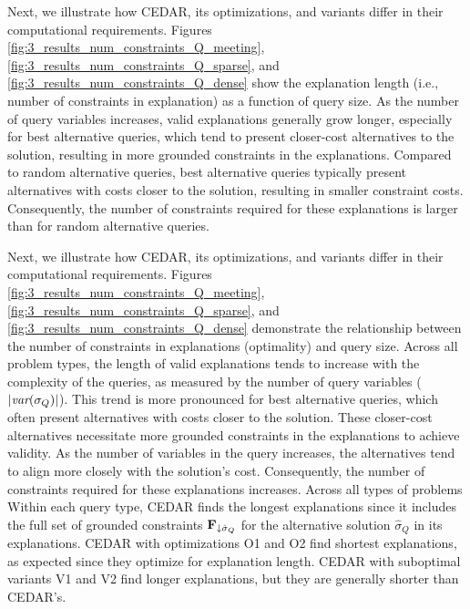 \documentclass[twoside,11pt]{article}
\begin{document}
Next, we illustrate how CEDAR, its optimizations, and variants differ in their computational requirements. Figures \ref{fig:3_results_num_constraints_Q_meeting}, \ref{fig:3_results_num_constraints_Q_sparse}, and \ref{fig:3_results_num_constraints_Q_dense} show the explanation length (i.e., number of constraints in explanation) as a function of query size. As the number of query variables increases, valid explanations generally grow longer, especially for best alternative queries, which tend to present closer-cost alternatives to the solution, resulting in more grounded constraints in the explanations. Compared to random alternative queries, best alternative queries typically present alternatives with costs closer to the solution, resulting in smaller constraint costs. Consequently, the number of constraints required for these explanations is larger than for random alternative queries.


Next, we illustrate how CEDAR, its optimizations, and variants differ in their computational requirements. Figures \ref{fig:3_results_num_constraints_Q_meeting}, \ref{fig:3_results_num_constraints_Q_sparse}, and \ref{fig:3_results_num_constraints_Q_dense} demonstrate the relationship between the number of constraints in explanations (optimality) and query size. Across all problem types, the length of valid explanations tends to increase with the complexity of the queries, as measured by the number of query variables ($|{\textit{var}(\sigma_Q)}|$). This trend is more pronounced for best alternative queries, which often present alternatives with costs closer to the solution. These closer-cost alternatives necessitate more grounded constraints in the explanations to achieve validity. As the number of variables in the query increases, the alternatives tend to align more closely with the solution's cost. Consequently, the number of constraints required for these explanations increases. Across all types of problems Within each query type, CEDAR finds the longest explanations since it includes the full set of grounded constraints ${\bf{F}}_{\downarrow \hat{\sigma}_Q}$ for the alternative solution $\hat{\sigma}_Q$ in its explanations. CEDAR with optimizations O1 and O2 find shortest explanations, as expected since they optimize for explanation length. CEDAR with suboptimal variants V1 and V2 find longer explanations, but they are generally shorter than CEDAR's.
\end{document}
